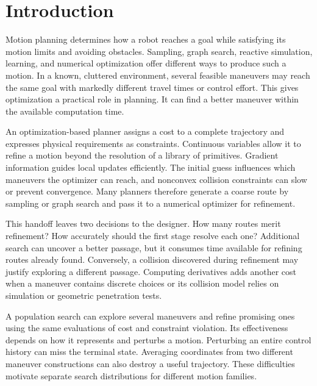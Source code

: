 \documentclass[a4paper]{cas-sc}
\begin{document}
\pagestyle{journal}\normalsize
\twocolumn[{\EAFront}]
\thispagestyle{journalfirst}
\begingroup\renewcommand{\thefootnote}{}\endgroup
\section{Introduction}
Motion planning determines how a robot reaches a goal while satisfying its motion limits and avoiding obstacles. Sampling, graph search, reactive simulation, learning, and numerical optimization offer different ways to produce such a motion. In a known, cluttered environment, several feasible maneuvers may reach the same goal with markedly different travel times or control effort. This gives optimization a practical role in planning. It can find a better maneuver within the available computation time.

An optimization-based planner assigns a cost to a complete trajectory and expresses physical requirements as constraints. Continuous variables allow it to refine a motion beyond the resolution of a library of primitives. Gradient information guides local updates efficiently. The initial guess influences which maneuvers the optimizer can reach, and nonconvex collision constraints can slow or prevent convergence. Many planners therefore generate a coarse route by sampling or graph search and pass it to a numerical optimizer for refinement.

This handoff leaves two decisions to the designer. How many routes merit refinement? How accurately should the first stage resolve each one? Additional search can uncover a better passage, but it consumes time available for refining routes already found. Conversely, a collision discovered during refinement may justify exploring a different passage. Computing derivatives adds another cost when a maneuver contains discrete choices or its collision model relies on simulation or geometric penetration tests.

A population search can explore several maneuvers and refine promising ones using the same evaluations of cost and constraint violation. Its effectiveness depends on how it represents and perturbs a motion. Perturbing an entire control history can miss the terminal state. Averaging coordinates from two different maneuver constructions can also destroy a useful trajectory. These difficulties motivate separate search distributions for different motion families.
\end{document}
